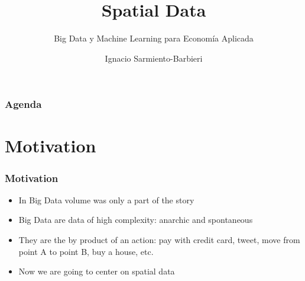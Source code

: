 \documentclass[
  shownotes,
  xcolor={svgnames},
  hyperref={colorlinks,citecolor=DarkBlue,linkcolor=andesred,urlcolor=DarkBlue}
  , aspectratio=169]{beamer}
\begin{document}
\title{Spatial Data}
\subtitle{Big Data y Machine Learning para Economía Aplicada}
\date{}

\author[Sarmiento-Barbieri]{Ignacio Sarmiento-Barbieri}


\begin{frame}[noframenumbering]
\maketitle
\end{frame}






\begin{frame}
\frametitle{Agenda}

\tableofcontents

\end{frame}




\section{Motivation }


\begin{frame}[fragile]
\frametitle{Motivation}


\begin{itemize}
  \item In Big Data  volume was only a part of the story 
  \bigskip
  \item Big Data are data of high complexity: anarchic and spontaneous
  \bigskip
  \item They are the by product of an action: pay with credit card, tweet, move from point A to point B, buy a house, etc.
  \bigskip
  \item Now we are going to center on spatial data
\end{itemize}

\end{frame}


\end{document}
